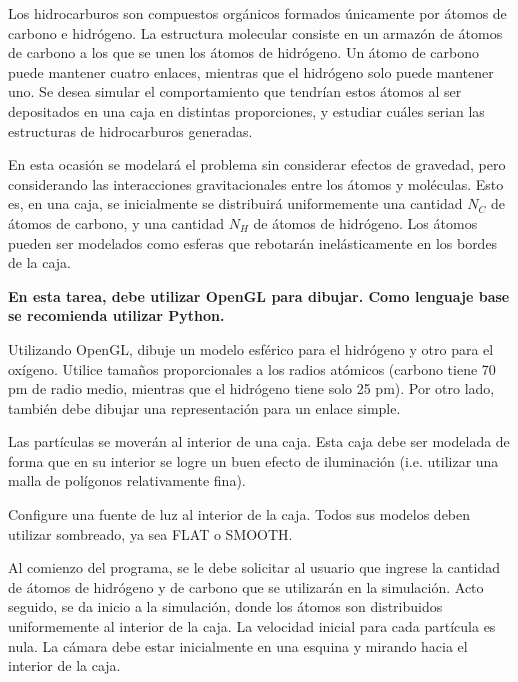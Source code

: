 \documentclass[letterpaper,11pt]{article} %
\begin{document}




Los hidrocarburos son compuestos orgánicos formados únicamente por átomos de carbono e hidrógeno. La estructura molecular consiste en un armazón de átomos de carbono a los que se unen los átomos de hidrógeno. Un átomo de carbono puede mantener cuatro enlaces, mientras que el hidrógeno solo puede mantener uno.
\newp Se desea simular el comportamiento que tendrían estos átomos al ser depositados en una caja en distintas proporciones, y estudiar cuáles serian las estructuras de hidrocarburos generadas.

\newp En esta ocasión se modelará el problema sin considerar efectos de gravedad, pero considerando las interacciones gravitacionales entre los átomos y moléculas. Esto es, en una caja, se inicialmente se distribuirá uniformemente una cantidad $N_C$ de átomos de carbono, y una cantidad $N_H$ de átomos de hidrógeno. Los átomos pueden ser modelados como esferas que rebotarán inelásticamente en los bordes de la caja.


\textbf{En esta tarea, debe utilizar OpenGL para dibujar. Como lenguaje base se recomienda utilizar Python.}


Utilizando OpenGL, dibuje un modelo esférico para el hidrógeno y otro para el oxígeno. Utilice tamaños proporcionales a los radios atómicos (carbono tiene 70 pm de radio medio, mientras que el hidrógeno tiene solo 25 pm).
Por otro lado, también debe dibujar una representación para un enlace simple.

\newp Las partículas se moverán al interior de una caja. Esta caja debe ser modelada de forma que en su interior se logre un buen efecto de iluminación (i.e. utilizar una malla de polígonos relativamente fina).

\newp Configure una fuente de luz al interior de la caja. Todos sus modelos deben utilizar sombreado, ya sea FLAT o SMOOTH.


Al comienzo del programa, se le debe solicitar al usuario que ingrese la cantidad de átomos de hidrógeno y de carbono que se utilizarán en la simulación. Acto seguido, se da inicio a la simulación, donde los átomos son distribuidos uniformemente al interior de la caja. La velocidad inicial para cada partícula es nula. La cámara debe estar inicialmente en una esquina y mirando hacia el interior de la caja.
\end{document}
